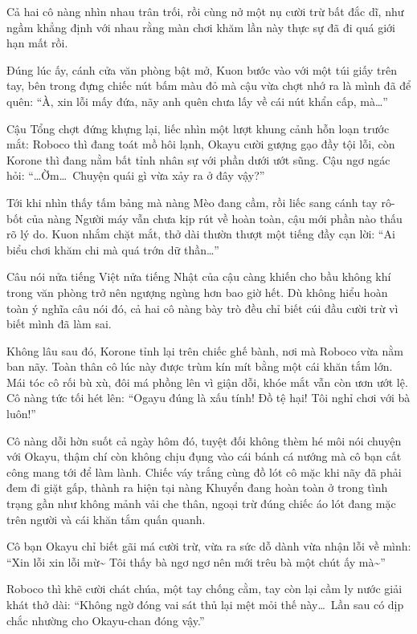\documentclass[../main.tex]{subfiles}
\begin{document}
Cả hai cô nàng nhìn nhau trân trối, rồi cùng nở một nụ cười trừ bất đắc dĩ, như ngầm khẳng định với nhau rằng màn chơi khăm lần này thực sự đã đi quá giới hạn mất rồi.

Đúng lúc ấy, cánh cửa văn phòng bật mở, Kuon bước vào với một túi giấy trên tay, bên trong đựng chiếc nút bấm màu đỏ mà cậu vừa chợt nhớ ra là mình đã để quên: ``À, xin lỗi mấy đứa, nãy anh quên chưa lấy về cái nút khẩn cấp, mà\dots''

Cậu Tổng chợt đứng khựng lại, liếc nhìn một lượt khung cảnh hỗn loạn trước mắt: Roboco thì đang toát mồ hôi lạnh, Okayu cười gượng gạo đầy tội lỗi, còn Korone thì đang nằm bất tỉnh nhân sự với phần dưới ướt sũng. Cậu ngơ ngác hỏi: ``\dots Ờm\dots\ Chuyện quái gì vừa xảy ra ở đây vậy?''

Tới khi nhìn thấy tấm bảng mà nàng Mèo đang cầm, rồi liếc sang cánh tay rô-bốt của nàng Người máy vẫn chưa kịp rút về hoàn toàn, cậu mới phần nào thấu rõ lý do. Kuon nhắm chặt mắt, thở dài thườn thượt một tiếng đầy cạn lời: ``Ai biểu chơi khăm chi mà quá trớn dữ thần\dots''

Câu nói nửa tiếng Việt nửa tiếng Nhật của cậu càng khiến cho bầu không khí trong văn phòng trở nên ngượng ngùng hơn bao giờ hết. Dù không hiểu hoàn toàn ý nghĩa câu nói đó, cả hai cô nàng bày trò đều chỉ biết cúi đầu cười trừ vì biết mình đã làm sai.

\ct

Không lâu sau đó, Korone tỉnh lại trên chiếc ghế bành, nơi mà Roboco vừa nằm ban nãy. Toàn thân cô lúc này được trùm kín mít bằng một cái khăn tắm lớn. Mái tóc cô rối bù xù, đôi má phồng lên vì giận dỗi, khóe mắt vẫn còn ươn ướt lệ. Cô nàng tức tối hét lên: ``Ogayu đúng là xấu tính! Đồ tệ hại! Tôi nghỉ chơi với bà luôn!''

Cô nàng dỗi hờn suốt cả ngày hôm đó, tuyệt đối không thèm hé môi nói chuyện với Okayu, thậm chí còn không chịu đụng vào cái bánh cá nướng mà cô bạn cất công mang tới để làm lành. Chiếc váy trắng cùng đồ lót cô mặc khi nãy đã phải đem đi giặt gấp, thành ra hiện tại nàng Khuyển đang hoàn toàn ở trong tình trạng gần như không mảnh vải che thân, ngoại trừ đúng chiếc áo lót đang mặc trên người và cái khăn tắm quấn quanh.

Cô bạn Okayu chỉ biết gãi má cười trừ, vừa ra sức dỗ dành vừa nhận lỗi về mình: ``Xin lỗi xin lỗi mừ\~{} Tôi thấy bà ngơ ngơ nên mới trêu bà một chút ấy mà\~{}''

Roboco thì khẽ cười chát chúa, một tay chống cằm, tay còn lại cầm ly nước giải khát thở dài: ``Không ngờ đóng vai sát thủ lại mệt mỏi thế này\dots\ Lần sau có dịp chắc nhường cho Okayu-chan đóng vậy.''
\end{document}
